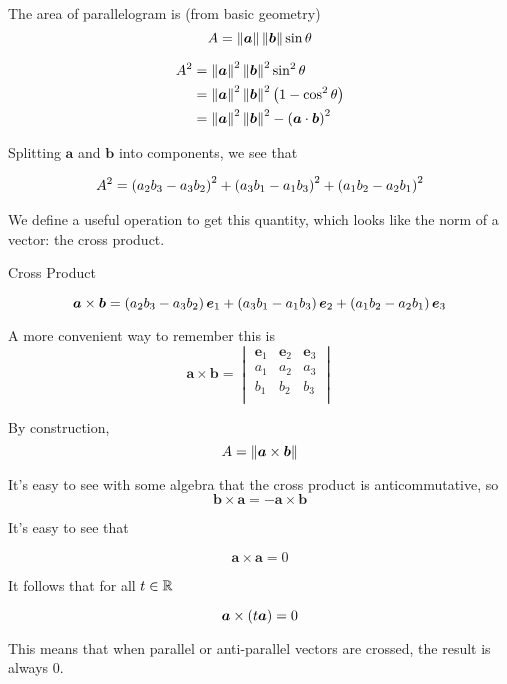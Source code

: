 \documentclass[11pt]{article}
\begin{document}
The area of parallelogram is (from basic geometry)
$$A = \left\lVert\bm{a}\right\rVert \left\lVert\bm{b}\right\rVert \sin \theta$$

\begin{align*}
  A^2 &= \left\lVert\bm{a}\right\rVert^2 \left\lVert\bm{b}\right\rVert^2 \sin^2 \theta \\
      &= \left\lVert\bm{a}\right\rVert^2 \left\lVert\bm{b}\right\rVert^2 \left ( 1 - \cos^2 \theta \right) \\
      &= \left\lVert\bm{a}\right\rVert^2 \left\lVert\bm{b}\right\rVert^2 - \left ( \bm{a} \cdot \bm{b} \right)^2 \\
\end{align*}

Splitting $\bm{a}$ and $\bm{b}$ into components, we see that

\begin{align*}
  A^2 &= \left ( a_2 b_3 - a_3 b_2 \right)^2 + \left ( a_3 b_1 - a_1 b_3 \right)^2 + \left ( a_1 b_2 - a_2 b_1 \right)^2 \\
\end{align*}

We define a useful operation to get this quantity, which looks like the norm of a vector: the cross product.

\begin{definition}{Cross Product}
  
  $$
  \bm{a} \times \bm{b} = \left ( a_2 b_3 - a_3 b_2 \right) \bm{e}_1 + \left ( a_3 b_1 - a_1 b_3 \right) \bm{e}_2 + \left ( a_1 b_2 - a_2 b_1 \right) \bm{e}_3
  $$

  A more convenient way to remember this is
  $$
  \bm{a} \times \bm{b} =
  \begin{vmatrix}
    \bm{e}_1 & \bm{e}_2 & \bm{e}_3 \\
    a_1 & a_2 & a_3 \\
    b_1 & b_2 & b_3 \\
  \end{vmatrix}
  $$
\end{definition}

By construction,
$$
A = \left\lVert\bm{a} \times \bm{b}\right\rVert
$$


It's easy to see with some algebra that the cross product is anticommutative, so
$$
\bm{b} \times \bm{a} = - \bm{a} \times \bm{b}
$$


\begin{example}

  It's easy to see that
  
  $$\bm{a} \times \bm{a} = 0$$
  
  It follows that for all $t \in \mathbb R$
  
  $$
  \bm{a} \times \left ( t \bm{a} \right) = 0 
  $$

  This means that when parallel or anti-parallel vectors are crossed, the result is always 0.
\end{example}
\end{document}
